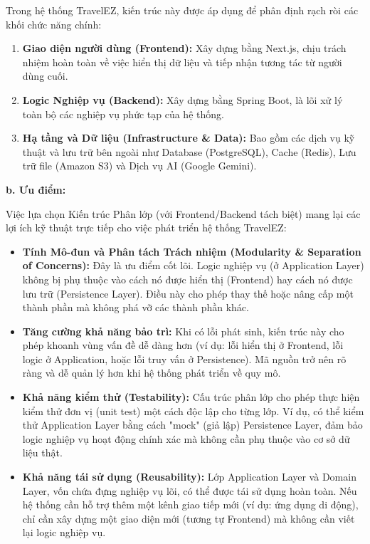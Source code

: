 Trong hệ thống TravelEZ, kiến trúc này được áp dụng để phân định rạch ròi các khối chức năng chính:
\begin{enumerate}
    \item \textbf{Giao diện người dùng (Frontend):} Xây dựng bằng Next.js, chịu trách nhiệm hoàn toàn về việc hiển thị dữ liệu và tiếp nhận tương tác từ người dùng cuối.
    \item \textbf{Logic Nghiệp vụ (Backend):} Xây dựng bằng Spring Boot, là lõi xử lý toàn bộ các nghiệp vụ phức tạp của hệ thống.
    \item \textbf{Hạ tầng và Dữ liệu (Infrastructure \& Data):} Bao gồm các dịch vụ kỹ thuật và lưu trữ bên ngoài như Database (PostgreSQL), Cache (Redis), Lưu trữ file (Amazon S3) và Dịch vụ AI (Google Gemini).
\end{enumerate}

\noindent\textbf{b. Ưu điểm:}\par
Việc lựa chọn Kiến trúc Phân lớp (với Frontend/Backend tách biệt) mang lại các lợi ích kỹ thuật trực tiếp cho việc phát triển hệ thống TravelEZ:
\begin{itemize}
    \item \textbf{Tính Mô-đun và Phân tách Trách nhiệm (Modularity \& Separation of Concerns):}
    Đây là ưu điểm cốt lõi. Logic nghiệp vụ (ở Application Layer) không bị phụ thuộc vào cách nó được hiển thị (Frontend)
    hay cách nó được lưu trữ (Persistence Layer). Điều này cho phép thay thế hoặc nâng cấp một thành phần mà không phá vỡ
    các thành phần khác.

    \item \textbf{Tăng cường khả năng bảo trì:}
    Khi có lỗi phát sinh, kiến trúc này cho phép khoanh vùng vấn đề dễ dàng hơn
    (ví dụ: lỗi hiển thị ở Frontend, lỗi logic ở Application, hoặc lỗi truy vấn ở Persistence).
    Mã nguồn trở nên rõ ràng và dễ quản lý hơn khi hệ thống phát triển về quy mô.

    \item \textbf{Khả năng kiểm thử (Testability):}
    Cấu trúc phân lớp cho phép thực hiện kiểm thử đơn vị (unit test) một cách độc lập cho từng lớp.
    Ví dụ, có thể kiểm thử Application Layer bằng cách "mock" (giả lập) Persistence Layer,
    đảm bảo logic nghiệp vụ hoạt động chính xác mà không cần phụ thuộc vào cơ sở dữ liệu thật.

    \item \textbf{Khả năng tái sử dụng (Reusability):}
    Lớp Application Layer và Domain Layer, vốn chứa đựng nghiệp vụ lõi, có thể được tái sử dụng hoàn toàn.
    Nếu hệ thống cần hỗ trợ thêm một kênh giao tiếp mới (ví dụ: ứng dụng di động),
    chỉ cần xây dựng một giao diện mới (tương tự Frontend) mà không cần viết lại logic nghiệp vụ.
\end{itemize}

